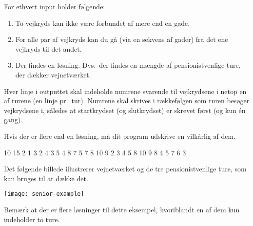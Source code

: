 \documentclass{boi2014-dk}
\begin{document}
    For ethvert input holder følgende:

    \begin{enumerate}
        \item To vejkryds kan ikke være forbundet af mere end en gade.
        \item For alle par af vejkryds kan du gå (via en sekvens af gader)
            fra det ene vejkryds til det andet.
        \item Der findes en løsning. Dvs.~der findes en mængde af
            pensionistvenlige ture, der dækker vejnetværket.
    \end{enumerate}

    \Output
    Hver linje i outputtet skal indeholde numrene svarende til vejkrydsene i
    netop en af turene (en linje pr.~tur). Numrene skal skrives i rækkefølgen
    som turen besøger vejkrydsene i, således at startkrydset (og slutkrydset)
    er skrevet først (og kun én gang).

    Hvis der er flere end en løsning, må dit program udskrive en vilkårlig
    af dem.

    \Example

    \example
    {
        10 15  2  1 3  2 4  3 5  4 8  7  5 7  8  10  9
    }
    {
        2 3 4 5 8 10 9  8 4  5 7 6 3
    }
    {
        Det følgende billede illustrerer vejnetværket og de tre
        pensionistvenlige ture, som kan bruges til at dække det.

        \texttt{[image: senior-example]}

        Bemærk at der er flere løsninger til dette eksempel, hvoriblandt
        en af dem kun indeholder to ture.
    }
\end{document}
